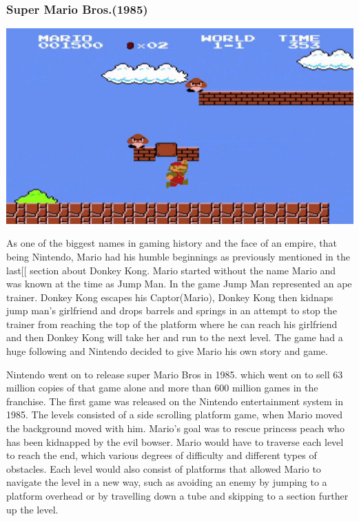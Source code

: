 \documentclass{article}
\begin{document}
\subsubsection{Super Mario Bros.(1985)}
\begin{minipage}{0.43\textwidth}
\includegraphics[width=\linewidth]{mario}
\end{minipage} \hfill
\begin{minipage}{0.55\textwidth}\raggedright
As one of the biggest names in gaming history and the face of an empire, that being Nintendo, Mario had his humble beginnings as previously mentioned in the last[[
 section about Donkey Kong. Mario started without the name Mario and was known at the time as Jump Man. In the game Jump Man represented an ape trainer. Donkey Kong escapes his Captor(Mario), Donkey Kong then kidnaps jump man's girlfriend and drops barrels and springs in an attempt to stop the trainer from reaching the top of the platform where he can reach his girlfriend and then Donkey Kong will take her and run to the next level. The game had a huge following and Nintendo decided to give Mario his own story and game.
\end{minipage} \newline \newline
Nintendo went on to release super Mario Bros in 1985. which went on to sell 63 million copies of that game alone and more than 600 million games in the franchise. The first game was released on the Nintendo entertainment system in 1985. The levels consisted of a side scrolling platform game, when Mario moved the background moved with him. Mario's goal was to rescue princess peach who has been kidnapped by the evil bowser. Mario would have to traverse each level to reach the end, which various degrees of difficulty and different types of obstacles. Each level would also consist of platforms that allowed Mario to navigate the level in a new way, such as avoiding an enemy by jumping to a platform overhead or by travelling down a tube and skipping to a section further up the level. \newline
\end{document}
